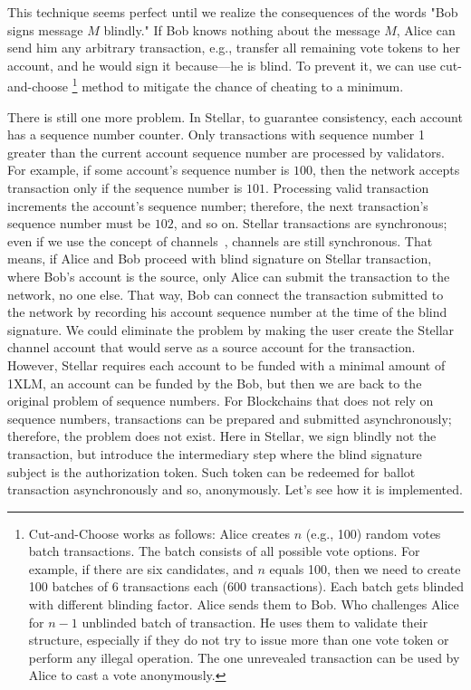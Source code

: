 \documentclass[applsci,article,submit,moreauthors,pdftex]{Definitions/mdpi}
\begin{document}
This technique seems perfect until we realize the consequences of the words "Bob signs message $M$ blindly." If Bob knows nothing about the message $M$, Alice can send him any arbitrary transaction, e.g., transfer all remaining vote tokens to her account, and he would sign it because––he is blind. To prevent it, we can use cut-and-choose \footnote{Cut-and-Choose works as follows: Alice creates $n$ (e.g., 100) random votes batch transactions. The batch consists of all possible vote options. For example, if there are six candidates, and $n$ equals 100, then we need to create 100 batches of 6 transactions each (600 transactions). Each batch gets blinded with different blinding factor. Alice sends them to Bob. Who challenges Alice for \(n-1\) unblinded batch of transaction. He uses them to validate their structure, especially if they do not try to issue more than one vote token or perform any illegal operation. The one unrevealed transaction can be used by Alice to cast a vote anonymously.}  method to mitigate the chance of cheating to a minimum.

There is still one more problem. In Stellar, to guarantee consistency, each account has a sequence number counter. Only transactions with sequence number 1 greater than the current account sequence number are processed by validators. For example, if some account's sequence number is $100$, then the network accepts transaction only if the sequence number is $101$. Processing valid transaction increments the account's sequence number; therefore, the next transaction's sequence number must be $102$, and so on. Stellar transactions are synchronous; even if we use the concept of channels~\cite{Channels80:online}, channels are still synchronous. That means, if Alice and Bob proceed with blind signature on Stellar transaction, where Bob's account is the source, only Alice can submit the transaction to the network, no one else. That way, Bob can connect the transaction submitted to the network by recording his account sequence number at the time of the blind signature. We could eliminate the problem by making the user create the Stellar channel account that would serve as a source account for the transaction. However, Stellar requires each account to be funded with a minimal amount of 1XLM, an account can be funded by the Bob, but then we are back to the original problem of sequence numbers. For Blockchains that does not rely on sequence numbers, transactions can be prepared and submitted asynchronously; therefore, the problem does not exist. Here in Stellar, we sign blindly not the transaction, but introduce the intermediary step where the blind signature subject is the authorization token. Such token can be redeemed for ballot transaction asynchronously and so, anonymously. Let's see how it is implemented. 
\end{document}
